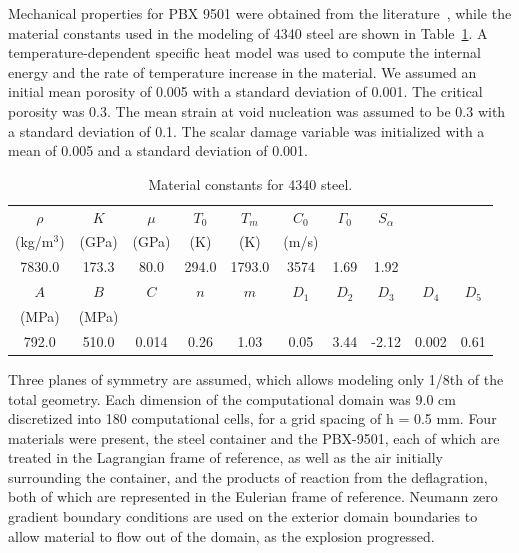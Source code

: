   Mechanical properties for PBX 9501 were obtained from the
  literature~\cite{Hackett2000Viscoscram}, while
  the material constants used in the modeling of 4340 steel are shown in
  Table~\ref{tab:matConst4340}.  A temperature-dependent specific heat model
  \cite{Goto2000} was used to compute the internal energy and the rate of 
  temperature increase in the material.  We assumed an initial mean porosity 
  of 0.005 with a standard deviation of 0.001.  The critical porosity was 0.3.
  The mean strain at void nucleation was assumed to be 0.3 with a standard 
  deviation of 0.1.  The scalar damage variable was initialized with a mean
  of 0.005 and a standard deviation of 0.001.
  
    \begin{table}[t]
    \caption{Material constants for 4340 steel.}
    \label{tab:matConst4340}
    \centering
    \small
    \renewcommand{\arraystretch}{1.25}
    {
    \begin{tabular}{cccccccccc}
    \hline\hline
    $\rho$    & $K$   & $\mu$ & $T_0$ & $T_m$ &$C_0$&$\Gamma_0$&$S_{\alpha}$ \\
    (kg/m$^3$)& (GPa) & (GPa) & (K)   & (K)   &(m/s)&          &             \\
    \hline
    7830.0    & 173.3 & 80.0  & 294.0 & 1793.0& 3574  & 1.69 & 1.92 \\
    \hline
    \hline
    $A$   & $B$   & $C$   & $n$  & $m$  & $D_1$ & $D_2$ & $D_3$ & $D_4$ &$D_5$\\
    (MPa) & (MPa) &       &      &      &       &       &       &       & \\
    \hline
    792.0 & 510.0 & 0.014 & 0.26 & 1.03 & 0.05  & 3.44  & -2.12 & 0.002 & 0.61\\
    \hline
    \end{tabular}
    }
  \end{table}

Three planes of symmetry are assumed, which allows modeling only 1/8th
of the total geometry.  Each dimension of the computational domain
was 9.0 cm discretized into 180 computational cells,
for a grid spacing of h = 0.5 mm.  Four materials were present,
the steel container and the PBX-9501, each of which are treated in
the Lagrangian frame of reference, as well as the air initially surrounding
the container, and the products of reaction from the deflagration, both
of which are represented in the Eulerian frame of reference.  Neumann
zero gradient boundary conditions are used on the exterior domain
boundaries to allow material to flow out of the domain, as the explosion
progressed.

